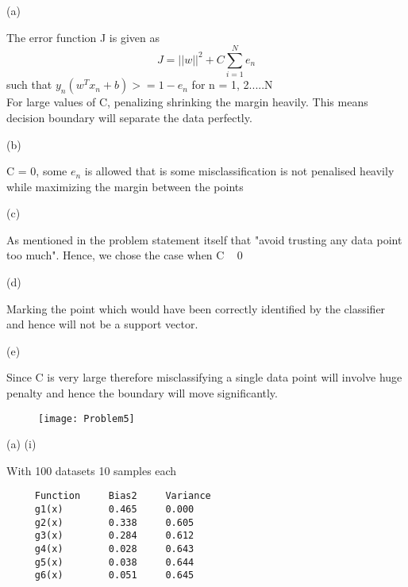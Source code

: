 \documentclass[12pt]{article}
\newenvironment{problem}[2][Problem]{\begin{trivlist}
\item[\hskip \labelsep {\bfseries #1}\hskip \labelsep {\bfseries #2.}]}{\end{trivlist}}
\begin{document}
\begin{problem} 5 (a)
\end{problem}
\begin{Answer}
The error function J is given as 
\begin{equation}
    J = ||w|| ^ 2 + C \sum_{i=1}^{N} e_{n} 
\end{equation}
such that $y_{n}(w^{T}x_{n} + b) >= 1 - e_{n}$ for n = 1, 2.....N\\
For large values of C, penalizing shrinking the margin heavily. This means decision boundary will separate the data perfectly.
\end{Answer}


\begin{problem} 5 (b)
\end{problem}
\begin{Answer}
C = 0, some $e_{n}$ is allowed that is some misclassification is not penalised heavily while maximizing the margin between the points
\end{Answer}

\begin{problem} 5 (c)
\end{problem}
\begin{Answer}
As mentioned in the problem statement itself that "avoid trusting any data point too much". Hence, we chose the case when C ~ 0
\end{Answer}

\begin{problem} 5 (d)
\end{problem}
\begin{Answer}
Marking the point which would have been correctly identified by the classifier and hence will not be a support vector.
\end{Answer}

\begin{problem} 5 (e)
\end{problem}
\begin{Answer}
Since C is very large therefore misclassifying a single data point will involve huge penalty and hence the boundary will move significantly.
\end{Answer}
\begin{figure}
    \advance\leftskip-1cm
    \texttt{[image: Problem5]}
\end{figure}

\clearpage
\begin{problem} 6 (a) (i)
\end{problem}
\begin{Answer}
With 100 datasets 10 samples each
\begin{verbatim}
     Function     Bias2     Variance
     g1(x)        0.465     0.000
     g2(x)        0.338     0.605
     g3(x)        0.284     0.612
     g4(x)        0.028     0.643
     g5(x)        0.038     0.644
     g6(x)        0.051     0.645
\end{verbatim}
\end{Answer}
\end{document}
